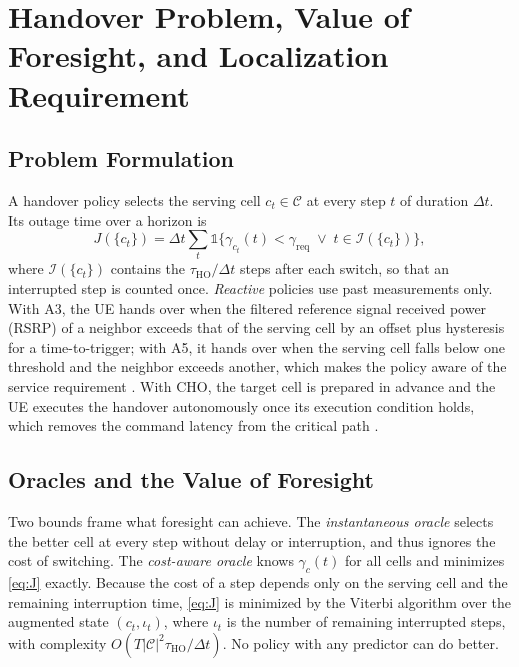 \documentclass[journal]{IEEEtran}
\begin{document}
\section{Handover Problem, Value of Foresight, and Localization Requirement}
\subsection{Problem Formulation}
A handover policy selects the serving cell $c_t\in\mathcal C$ at every
step $t$ of duration $\Delta t$. Its outage time over a horizon is
\begin{equation}
J(\{c_t\})=\Delta t\sum_t \mathbb 1\bigl\{\gamma_{c_t}(t)<\gamma_{\mathrm{req}}
\;\lor\; t\in\mathcal I(\{c_t\})\bigr\},
\label{eq:J}
\end{equation}
where $\mathcal I(\{c_t\})$ contains the $\tau_{\mathrm{HO}}/\Delta t$
steps after each switch, so that an interrupted step is counted once.
\emph{Reactive} policies use past measurements only. With A3, the UE
hands over when the filtered reference signal received power (RSRP) of a
neighbor exceeds that of the serving cell by an offset plus hysteresis
for a time-to-trigger; with A5, it hands over when the serving cell falls
below one threshold and the neighbor exceeds another, which makes the
policy aware of the service requirement \cite{3gpp38331}.
\textcolor{propcol}{With CHO, the target cell is prepared in advance and
the UE executes the handover autonomously once its execution condition
holds, which removes the command latency from the critical path
\cite{3gpp38331cho,3gpp38300}.}

\subsection{Oracles and the Value of Foresight}
Two bounds frame what foresight can achieve. The \emph{instantaneous
oracle} selects the better cell at every step without delay or
interruption, and thus ignores the cost of switching. The
\emph{cost-aware oracle} knows $\gamma_c(t)$ for all cells and minimizes
\eqref{eq:J} exactly. Because the cost of a step depends only on the
serving cell and the remaining interruption time, \eqref{eq:J} is
minimized by the Viterbi algorithm over the augmented state
$(c_t,\iota_t)$, where $\iota_t$ is the number of remaining interrupted
steps, with complexity $O(T|\mathcal C|^2\tau_{\mathrm{HO}}/\Delta t)$.
No policy with any predictor can do better.
\end{document}
